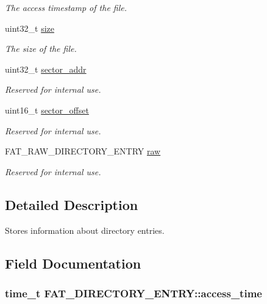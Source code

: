 \begin{DoxyCompactItemize}
\begin{DoxyCompactList}\small\item\em The access timestamp of the file.\end{DoxyCompactList}\item 
uint32\-\_\-t \hyperlink{struct_f_a_t___d_i_r_e_c_t_o_r_y___e_n_t_r_y_afad000dca462c9f075683b297b956b50}{size}
\begin{DoxyCompactList}\small\item\em The size of the file.\end{DoxyCompactList}\item 
uint32\-\_\-t \hyperlink{struct_f_a_t___d_i_r_e_c_t_o_r_y___e_n_t_r_y_a221135da1ee1a12c4a1112ffd636550a}{sector\-\_\-addr}
\begin{DoxyCompactList}\small\item\em Reserved for internal use.\end{DoxyCompactList}\item 
uint16\-\_\-t \hyperlink{struct_f_a_t___d_i_r_e_c_t_o_r_y___e_n_t_r_y_ad756694bfe026279262fb77eb5148cd0}{sector\-\_\-offset}
\begin{DoxyCompactList}\small\item\em Reserved for internal use.\end{DoxyCompactList}\item 
F\-A\-T\-\_\-\-R\-A\-W\-\_\-\-D\-I\-R\-E\-C\-T\-O\-R\-Y\-\_\-\-E\-N\-T\-R\-Y \hyperlink{struct_f_a_t___d_i_r_e_c_t_o_r_y___e_n_t_r_y_a608a35428c3c650dc24b3c1136d8df93}{raw}
\begin{DoxyCompactList}\small\item\em Reserved for internal use.\end{DoxyCompactList}\end{DoxyCompactItemize}


\subsection{Detailed Description}
Stores information about directory entries. 

\subsection{Field Documentation}
\hypertarget{struct_f_a_t___d_i_r_e_c_t_o_r_y___e_n_t_r_y_a156d9e92fdcb395338c433dcf32e4e19}{
\subsubsection[{access\-\_\-time}]{\setlength{\rightskip}{0pt plus 5cm}time\-\_\-t F\-A\-T\-\_\-\-D\-I\-R\-E\-C\-T\-O\-R\-Y\-\_\-\-E\-N\-T\-R\-Y\-::access\-\_\-time}}\label{struct_f_a_t___d_i_r_e_c_t_o_r_y___e_n_t_r_y_a156d9e92fdcb395338c433dcf32e4e19}


